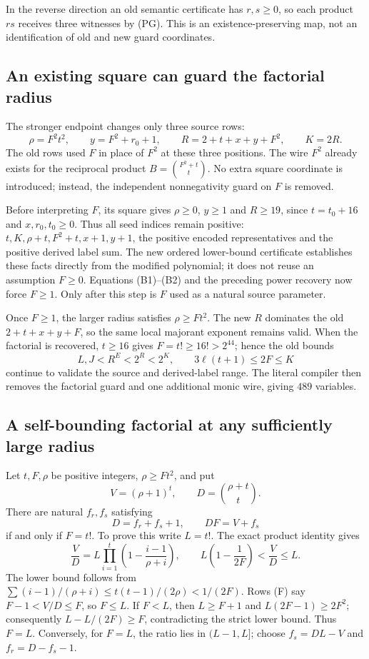 In the reverse direction an old semantic certificate has $r,s\ge0$,
so each product $rs$ receives three witnesses by (PG). This is an
existence-preserving map, not an identification of old and new guard
coordinates.

\subsection{An existing square can guard the factorial radius}
The stronger endpoint changes only three source rows:
\[
 \rho=F^2t^2,\qquad y=F^2+r_0+1,\qquad
 R=2+t+x+y+F^2,\qquad K=2R.                              \tag{SQ}
\]
The old rows used $F$ in place of $F^2$ at these three positions. The
wire $F^2$ already exists for the reciprocal product
$B=\binom{F^2+t}{t}$. No extra square coordinate is introduced; instead,
the independent nonnegativity guard on $F$ is removed.

Before interpreting $F$, its square gives $\rho\ge0$, $y\ge1$ and
$R\ge19$, since $t=t_0+16$ and $x,r_0,t_0\ge0$. Thus all seed
indices remain positive: $t,K,\rho+t,F^2+t,x+1,y+1$, the positive
encoded representatives and the positive derived label sum. The new
ordered lower-bound certificate establishes these facts directly from the
modified polynomial; it does not reuse an assumption $F\ge0$.
Equations (B1)--(B2) and the preceding power recovery now force $F\ge1$.
Only after this step is $F$ used as a natural source parameter.

Once $F\ge1$, the larger radius satisfies $\rho\ge Ft^2$.
The new $R$ dominates the old $2+t+x+y+F$, so the same local majorant
exponent remains valid. When the factorial is recovered, $t\ge16$ gives
$F=t!\ge16!>2^{44}$; hence the old bounds
\[
 L,J<R^E<2^R<2^K,\qquad 3\ell(t+1)\le2F\le K
\]
continue to validate the source and derived-label range. The literal
compiler then removes the factorial guard and one additional monic wire,
giving $489$ variables.

\subsection{A self-bounding factorial at any sufficiently large radius}
Let $t,F,\rho$ be positive integers, $\rho\ge Ft^2$, and put
\[
 V=(\rho+1)^t,\qquad D=\binom{\rho+t}{t}.
\]
There are natural $f_r,f_s$ satisfying
\[
 D=f_r+f_s+1,\qquad DF=V+f_s                              \tag{F}
\]
if and only if $F=t!$. To prove this write $L=t!$. The exact product
identity gives
\[
 \frac VD=L\prod_{i=1}^t\left(1-\frac{i-1}{\rho+i}\right),
 \qquad L\left(1-\frac1{2F}\right)<\frac VD\le L.
\]
The lower bound follows from
$\sum(i-1)/(\rho+i)\le t(t-1)/(2\rho)<1/(2F)$.
Rows (F) say $F-1<V/D\le F$, so $F\le L$. If $F<L$, then
$L\ge F+1$ and $L(2F-1)\ge2F^2$; consequently
$L-L/(2F)\ge F$, contradicting the strict lower bound. Thus $F=L$.
Conversely, for $F=L$, the ratio lies in $(L-1,L]$; choose
$f_s=DL-V$ and $f_r=D-f_s-1$.

